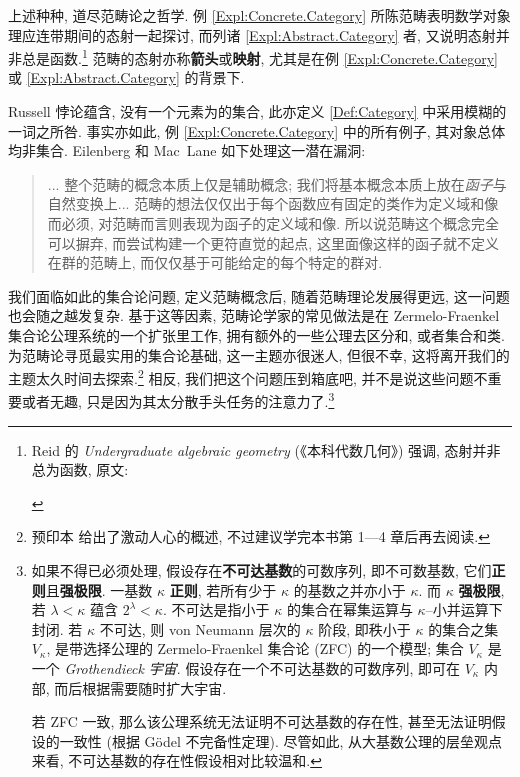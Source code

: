 \par 上述种种, 道尽范畴论之哲学. 例 \ref{Expl:Concrete.Category} 所陈范畴表明数学对象理应连带期间的态射一起探讨, 而列诸 \ref{Expl:Abstract.Category} 者, 又说明态射并非总是函数.\footnote{Reid 的 \textit{Undergraduate algebraic geometry} (《本科代数几何》) 强调, 态射并非总为函数, 原文\cite[p. 4]{Rei88}:\begin{quote}
\end{quote}} 范畴的态射亦称\textbf{箭头}或\textbf{映射}, 尤其是在例 \ref{Expl:Concrete.Category} 或 \ref{Expl:Abstract.Category} 的背景下.
\begin{remark}
    Russell 悖论蕴含, 没有一个元素为的集合, 此亦定义 \ref{Def:Category} 中采用模糊的一词之所咎. 事实亦如此, 例 \ref{Expl:Concrete.Category} 中的所有例子, 其对象总体均非集合. Eilenberg 和 Mac~Lane 如下处理这一潜在漏洞:
        \begin{quote}
            ... 整个范畴的概念本质上仅是辅助概念; 我们将基本概念本质上放在\textit{函子}与自然变换上... 范畴的想法仅仅出于每个函数应有固定的类作为定义域和像而必须, 对范畴而言则表现为函子的定义域和像. 所以说范畴这个概念完全可以摒弃, 而尝试构建一个更符直觉的起点, 这里面像\squarebrace{\(\Hom\)}这样的函子就不定义在群的范畴上,  而仅仅基于可能给定的每个特定的群对. \cite{EM45}
        \end{quote}
    我们面临如此的集合论问题, 定义范畴概念后, 随着范畴理论发展得更远, 这一问题也会随之越发复杂. 基于这等因素, 范畴论学家的常见做法是在 Zermelo-Fraenkel 集合论公理系统的一个扩张里工作, 拥有额外的一些公理去区分和, 或者集合和类. 为范畴论寻觅最实用的集合论基础, 这一主题亦很迷人, 但很不幸, 这将离开我们的主题太久时间去探索.\footnote{预印本 \cite{Shu08} 给出了激动人心的概述, 不过建议学完本书第 1---4 章后再去阅读.} 相反, 我们把这个问题压到箱底吧, 并不是说这些问题不重要或者无趣, 只是因为其太分散手头任务的注意力了.\footnote{如果不得已必须处理, 假设存在\textbf{不可达基数}的可数序列, 即不可数基数, 它们\textbf{正则}且\textbf{强极限}. 一基数 \(\kappa\) \textbf{正则}, 若所有少于 \(\kappa\) 的基数之并亦小于 \(\kappa\). 而 \(\kappa\) \textbf{强极限}, 若 \(\lambda<\kappa\) 蕴含 \(2^\lambda<\kappa\). 不可达是指小于 \(\kappa\) 的集合在幂集运算与 \(\kappa\)--小并运算下封闭. 若 \(\kappa\) 不可达, 则 von Neumann 层次的 \(\kappa\) 阶段, 即秩小于 \(\kappa\) 的集合之集 \(V_\kappa\), 是带选择公理的 Zermelo-Fraenkel 集合论 (ZFC) 的一个模型; 集合 \(V_\kappa\) 是一个 \textit{Grothendieck 宇宙}. 假设存在一个不可达基数的可数序列, 即可在 \(V_\kappa\) 内部, 而后根据需要随时扩大宇宙.
    \par 若 ZFC 一致, 那么该公理系统无法证明不可达基数的存在性, 甚至无法证明假设的一致性 (根据 G\"odel 不完备性定理). 尽管如此, 从大基数公理的层垒观点来看, 不可达基数的存在性假设相对比较温和.}
\end{remark}
